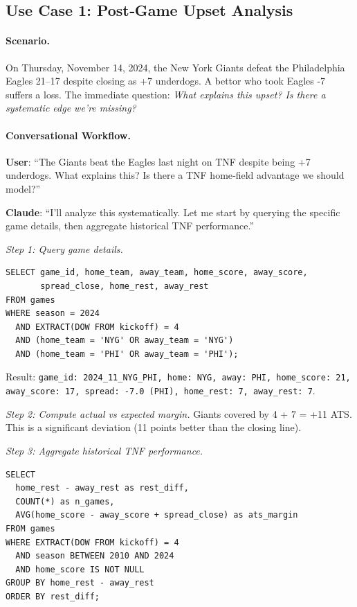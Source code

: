 \subsection{Use Case 1: Post‑Game Upset Analysis}
\label{subsec:use_case_upset}

\paragraph{Scenario.}
On Thursday, November 14, 2024, the New York Giants defeat the Philadelphia Eagles 21--17 despite closing as +7 underdogs. A bettor who took Eagles -7 suffers a loss. The immediate question: \textit{What explains this upset? Is there a systematic edge we're missing?}

\paragraph{Conversational Workflow.}
\textbf{User}: ``The Giants beat the Eagles last night on TNF despite being +7 underdogs. What explains this? Is there a TNF home‑field advantage we should model?''

\textbf{Claude}: ``I'll analyze this systematically. Let me start by querying the specific game details, then aggregate historical TNF performance.''

\textit{Step 1: Query game details.}
\begin{verbatim}
SELECT game_id, home_team, away_team, home_score, away_score,
       spread_close, home_rest, away_rest
FROM games
WHERE season = 2024
  AND EXTRACT(DOW FROM kickoff) = 4
  AND (home_team = 'NYG' OR away_team = 'NYG')
  AND (home_team = 'PHI' OR away_team = 'PHI');
\end{verbatim}

Result: \texttt{game\_id: 2024\_11\_NYG\_PHI, home: NYG, away: PHI, home\_score: 21, away\_score: 17, spread: -7.0 (PHI), home\_rest: 7, away\_rest: 7}.

\textit{Step 2: Compute actual vs expected margin.}
Giants covered by 4 + 7 = +11 ATS. This is a significant deviation (11 points better than the closing line).

\textit{Step 3: Aggregate historical TNF performance.}
\begin{verbatim}
SELECT
  home_rest - away_rest as rest_diff,
  COUNT(*) as n_games,
  AVG(home_score - away_score + spread_close) as ats_margin
FROM games
WHERE EXTRACT(DOW FROM kickoff) = 4
  AND season BETWEEN 2010 AND 2024
  AND home_score IS NOT NULL
GROUP BY home_rest - away_rest
ORDER BY rest_diff;
\end{verbatim}

